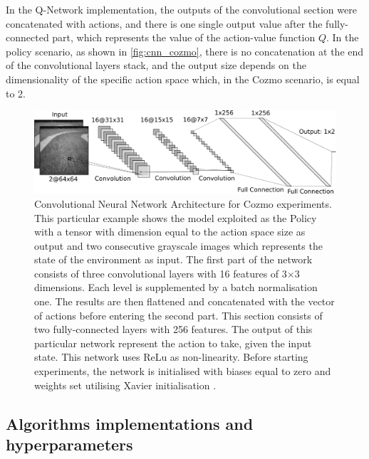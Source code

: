 In the Q-Network implementation, the outputs of the convolutional section were concatenated with actions, and there is one single output value after the fully-connected part, which represents the value of the action-value function $Q$.
In the policy scenario, as shown in \vref{fig:cnn_cozmo}, there is no concatenation at the end of the convolutional layers stack, and the output size depends on the dimensionality of the specific action space which, in the Cozmo scenario, is equal to 2.

\begin{figure}

    \centering
    \includegraphics[width=\textwidth]{img/cnn_cozmo.png}
    \caption[Convolutional Neural Network Architecture for Cozmo experiments]{ Convolutional Neural Network Architecture for Cozmo experiments.
        This particular example shows the model exploited as the Policy with a tensor with dimension equal to the action space size as output and two consecutive grayscale images which represents the state of the environment as input.
        The first part of the network consists of three convolutional layers with 16 features of 3$\times$3 dimensions.
        Each level is supplemented by a batch normalisation one.
        The results are then flattened and concatenated with the vector of actions before entering the second part.
        This section consists of two fully-connected layers with 256 features.
        The output of this particular network represent the action to take, given the input state.
        This network uses ReLu as non-linearity.
        Before starting experiments, the network is initialised with biases equal to zero and weights set utilising Xavier initialisation \cite{glorot2010understanding}.}
    \label{fig:cnn_cozmo}
\end{figure}

\subsection{Algorithms implementations and hyperparameters}

